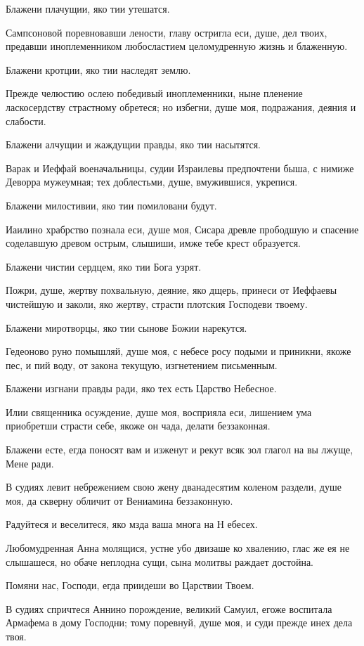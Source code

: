 Блажени плачущии, яко тии утешатся.


Сампсоновой поревновавши лености, главу остригла еси, душе, дел твоих, предавши иноплеменником любосластием целомудренную жизнь и блаженную.


Блажени кротции, яко тии наследят землю.


Прежде челюстию ослею победивый иноплеменники, ныне пленение ласкосердству страстному обретеся; но избегни, душе моя, подражания, деяния и слабости.


Блажени алчущии и жаждущии правды, яко тии насытятся.


Варак и Иеффай военачальницы, судии Израилевы предпочтени быша, с нимиже Деворра мужеумная; тех доблестьми, душе, вмужившися, укрепися.


Блажени милостивии, яко тии помиловани будут.


Иаилино храбрство познала еси, душе моя, Сисара древле прободшую и спасение соделавшую древом острым, слышиши, имже тебе крест образуется.


Блажени чистии сердцем, яко тии Бога узрят.


Пожри, душе, жертву похвальную, деяние, яко дщерь, принеси от Иеффаевы чистейшую и заколи, яко жертву, страсти плотския Господеви твоему.


Блажени миротворцы, яко тии сынове Божии нарекутся.


Гедеоново руно помышляй, душе моя, с небесе росу подыми и приникни, якоже пес, и пий воду, от закона текущую, изгнетением письменным.


Блажени изгнани правды ради, яко тех есть Царство Небесное.


Илии священника осуждение, душе моя, восприяла еси, лишением ума приобретши страсти себе, якоже он чада, делати беззаконная.


Блажени есте, егда поносят вам и изженут и рекут всяк зол глагол на вы лжуще, Мене ради.


В судиях левит небрежением свою жену дванадесятим коленом раздели, душе моя, да скверну обличит от Вениамина беззаконную.


Радуйтеся и веселитеся, яко мзда ваша многа на Н ебесех.


Любомудренная Анна молящися, устне убо двизаше ко хвалению, глас же ея не слышашеся, но обаче неплодна сущи, сына молитвы раждает достойна.


Помяни нас, Господи, егда приидеши во Царствии Твоем.


В судиях спричтеся Аннино порождение, великий Самуил, егоже воспитала Армафема в дому Господни; тому поревнуй, душе моя, и суди прежде инех дела твоя.


